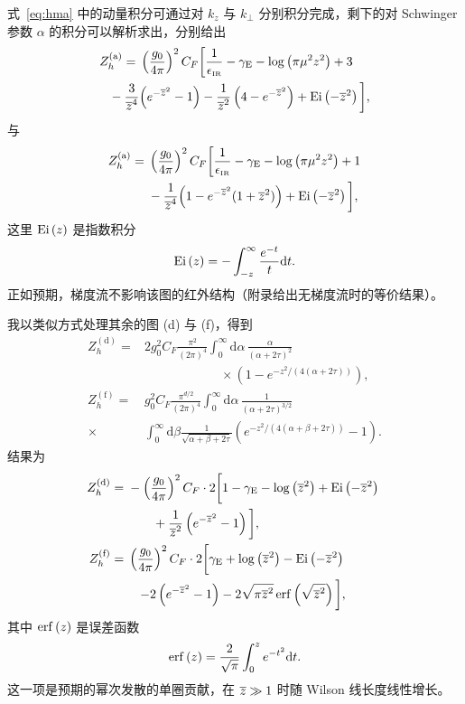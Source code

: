 式~\eqref{eq:hma} 中的动量积分可通过对 $k_z$ 与 $k_\perp$ 分别积分完成，剩下的对 Schwinger 参数 $\alpha$ 的积分可以解析求出，分别给出
\begin{align}
Z_h^{\mathrm{(a)}} = {} & \left(\frac{g_0}{4\pi}\right)^2C_F\bigg[\frac{1}{\epsilon_{\scriptscriptstyle\mathrm{IR}}} -\gamma_{\mathrm{E}}-\log\left(\pi \mu^2z^2\right) +3\nonumber\\
{} - \frac{3}{\overline{z}^4} & \Big(e^{-\overline{z}^2}-1\Big)- \frac{1}{\overline{z}^2} \left(4-e^{-\overline{z}^2}\right)+\operatorname{Ei}\left(-\overline{z}^2\right)\bigg], \label{eq:hta1}
\end{align}
与
\begin{align}
Z_h^{\mathrm{(a)}} = {} &\left(\frac{g_0}{4\pi}\right)^2C_F \bigg[\frac{1}{\epsilon_{\scriptscriptstyle\mathrm{IR}}}-\gamma_{\mathrm{E}}-\log\left(\pi \mu^2z^2\right)+1\nonumber\\
&{} -\frac{1}{\overline{z}^4}\Big(1-e^{-\overline{z}^2}(1+\overline{z}^2)\Big)+\operatorname{Ei}\left(-\overline{z}^2\right) \bigg], \label{eq:hta2}
\end{align}
这里 $\operatorname{Ei}\left(z\right)$ 是指数积分
\begin{equation}
\operatorname{Ei}\left(z\right) = -\int_{-z}^\infty \frac{e^{-t}}{t}\mathrm{d}t.
\end{equation}
正如预期，梯度流不影响该图的红外结构（附录给出无梯度流时的等价结果）。

我以类似方式处理其余的图 (d) 与 (f)，得到
\begin{align}
Z_h^\mathrm{(d)} = {} & 2 g_0^2C_F\frac{\pi^2}{(2\pi)^4}\int_0^\infty\mathrm{d}\alpha\,\frac{\alpha}{(\alpha+2\tau)^2}\nonumber \\
{} & \qquad \qquad\qquad\times \left(1-e^{-z^2/(4(\alpha+2\tau))}\right),\\
Z_h^\mathrm{(f)} = {} & g_0^2C_F \frac{\pi^{d/2}}{(2\pi)^4}\int_0^\infty\mathrm{d}\alpha\,\frac{1}{(\alpha+2\tau)^{3/2}} \nonumber \\
\times {} & \int_0^\infty\mathrm{d}\beta\frac{1}{\sqrt{\alpha+\beta+2\tau}}\left(e^{-z^2/(4(\alpha+\beta+2\tau))}-1\right).
\end{align}
结果为
\begin{align}
\!\!Z_h^\mathrm{(d)} = {} & -\left(\frac{g_0}{4\pi}\right)^2C_F \cdot2\bigg[1-\gamma_{\mathrm{E}}-\log\left(\overline{z}^2\right)+\operatorname{Ei}\left(-\overline{z}^2\right) \nonumber \\
{} & \qquad  + \frac{1}{\overline{z}^2}\left(e^{-\overline{z}^2}-1\right)\bigg], \label{eq:htd}\\
\!\!
Z_h^\mathrm{(f)} = {} & \left(\frac{g_0}{4\pi}\right)^2C_F \cdot2\bigg[\gamma_{\mathrm{E}}+\log\left(\overline{z}^2\right)- \operatorname{Ei}\left(-\overline{z}^2\right)  \nonumber \\
{} & \quad {-} 2\left(e^{-\overline{z}^2}-1\right) -2\sqrt{\pi\overline{z}^2}\operatorname{erf}\left(\sqrt{\overline{z}^2}\right)\bigg],
\label{eq:htf}
\end{align}
其中 $\operatorname{erf}\left(z\right)$ 是误差函数
\begin{equation}
\operatorname{erf}\left(z\right) = \frac{2}{\sqrt{\pi}}\int_0^z e^{-t^2}\mathrm{d}t.
\end{equation}
这一项是预期的幂次发散的单圈贡献，在 $\overline{z} \gg 1$ 时随 Wilson 线长度线性增长。

